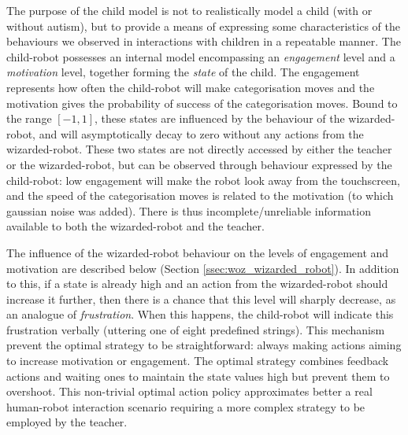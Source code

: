 The purpose of the child model is not to realistically model a child (with or without autism), but to provide a means of expressing some characteristics of the behaviours we observed in interactions with children in a repeatable manner. The child-robot possesses an internal model encompassing an \emph{engagement} level and a \emph{motivation} level, together forming the \textit{state} of the child. The engagement represents how often the child-robot will make categorisation moves and the motivation gives the probability of success of the categorisation moves. Bound to the range $[-1, 1]$, these states are influenced by the behaviour of the wizarded-robot, and will asymptotically decay to zero without any actions from the wizarded-robot. These two states are not directly accessed by either the teacher or the wizarded-robot, but can be observed through behaviour expressed by the child-robot: low engagement will make the robot look away from the touchscreen, and the speed of the categorisation moves is related to the motivation (to which gaussian noise was added). There is thus incomplete/unreliable information available to both the wizarded-robot and the teacher.

The influence of the wizarded-robot behaviour on the levels of engagement and motivation are described below (Section \ref{ssec:woz_wizarded_robot}). In addition to this, if a state is already high and an action from the wizarded-robot should increase it further, then there is a chance that this level will sharply decrease, as an analogue of \textit{frustration}. When this happens, the child-robot will indicate this frustration verbally (uttering one of eight predefined strings). This mechanism prevent the optimal strategy to be straightforward: always making actions aiming to increase motivation or engagement. The optimal strategy combines feedback actions and waiting ones to maintain the state values high but prevent them to overshoot. This non-trivial optimal action policy approximates better a real human-robot interaction scenario requiring a more complex strategy to be employed by the teacher.


